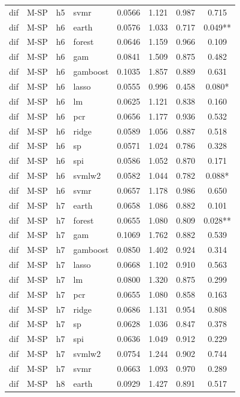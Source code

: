 \begin{ThreePartTable}
\begin{longtable}[t]{llclcccc}
dif & M-SP & h5 & svmr & 0.0566 & 1.121 & 0.987 & 0.715\\
\addlinespace
dif & M-SP & h6 & earth & 0.0576 & 1.033 & 0.717 & 0.049**\\
dif & M-SP & h6 & forest & 0.0646 & 1.159 & 0.966 & 0.109\\
dif & M-SP & h6 & gam & 0.0841 & 1.509 & 0.875 & 0.482\\
dif & M-SP & h6 & gamboost & 0.1035 & 1.857 & 0.889 & 0.631\\
dif & M-SP & h6 & lasso & 0.0555 & 0.996 & 0.458 & 0.080*\\
dif & M-SP & h6 & lm & 0.0625 & 1.121 & 0.838 & 0.160\\
dif & M-SP & h6 & pcr & 0.0656 & 1.177 & 0.936 & 0.532\\
dif & M-SP & h6 & ridge & 0.0589 & 1.056 & 0.887 & 0.518\\
dif & M-SP & h6 & sp & 0.0571 & 1.024 & 0.786 & 0.328\\
dif & M-SP & h6 & spi & 0.0586 & 1.052 & 0.870 & 0.171\\
dif & M-SP & h6 & svmlw2 & 0.0582 & 1.044 & 0.782 & 0.088*\\
dif & M-SP & h6 & svmr & 0.0657 & 1.178 & 0.986 & 0.650\\
\addlinespace
dif & M-SP & h7 & earth & 0.0658 & 1.086 & 0.882 & 0.101\\
dif & M-SP & h7 & forest & 0.0655 & 1.080 & 0.809 & 0.028**\\
dif & M-SP & h7 & gam & 0.1069 & 1.762 & 0.882 & 0.539\\
dif & M-SP & h7 & gamboost & 0.0850 & 1.402 & 0.924 & 0.314\\
dif & M-SP & h7 & lasso & 0.0668 & 1.102 & 0.910 & 0.563\\
dif & M-SP & h7 & lm & 0.0800 & 1.320 & 0.875 & 0.299\\
dif & M-SP & h7 & pcr & 0.0655 & 1.080 & 0.858 & 0.163\\
dif & M-SP & h7 & ridge & 0.0686 & 1.131 & 0.954 & 0.808\\
dif & M-SP & h7 & sp & 0.0628 & 1.036 & 0.847 & 0.378\\
dif & M-SP & h7 & spi & 0.0636 & 1.049 & 0.912 & 0.229\\
dif & M-SP & h7 & svmlw2 & 0.0754 & 1.244 & 0.902 & 0.744\\
dif & M-SP & h7 & svmr & 0.0663 & 1.093 & 0.970 & 0.289\\
\addlinespace
dif & M-SP & h8 & earth & 0.0929 & 1.427 & 0.891 & 0.517\\

\end{longtable}
\end{ThreePartTable}
